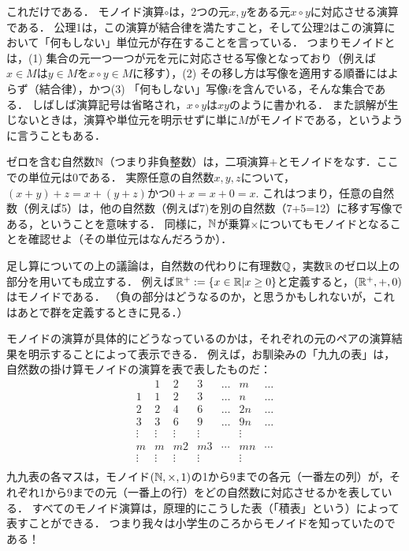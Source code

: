 \documentclass[11pt,a4paper,uplatex]{jsarticle}
\begin{document}
これだけである．
モノイド演算$\circ$は，2つの元$x,y$をある元$x \circ y$に対応させる演算である．
公理1は，この演算が結合律を満たすこと，そして公理2はこの演算において「何もしない」単位元が存在することを言っている．
つまりモノイドとは，(1) 集合の元一つ一つが元を元に対応させる写像となっており（例えば$x\in M$は$y \in M$を$x\circ y \in M$に移す），(2) その移し方は写像を適用する順番にはよらず（結合律），かつ(3) 「何もしない」写像$i$を含んでいる，そんな集合である．
しばしば演算記号は省略され，$x \circ y$は$xy$のように書かれる．
また誤解が生じないときは，演算や単位元を明示せずに単に$M$がモノイドである，というように言うこともある．


\begin{example}
ゼロを含む自然数$\mathbb{N}$（つまり非負整数）は，二項演算$+$とモノイドをなす．ここでの単位元は$0$である．
実際任意の自然数$x, y, z$について，$(x+y)+z = x + (y+z)$かつ$0 + x = x + 0 = x$. 
これはつまり，任意の自然数（例えば5）は，他の自然数（例えば7)を別の自然数（7+5=12）に移す写像である，ということを意味する．
同様に，$\mathbb{N}$が乗算$\times$についてもモノイドとなることを確認せよ（その単位元はなんだろうか）．
\end{example}

\begin{example}
足し算についての上の議論は，自然数の代わりに有理数$\mathbb{Q}$，実数$\mathbb{R}$のゼロ以上の部分を用いても成立する．
例えば$\mathbb{R}^+ := \{ x \in \mathbb{R} | x \geq 0 \}$と定義すると，$(\mathbb{R}^+, +, 0)$はモノイドである．
（負の部分はどうなるのか，と思うかもしれないが，これはあとで群を定義するときに見る．）
\end{example}

モノイドの演算が具体的にどうなっているのかは，それぞれの元のペアの演算結果を明示することによって表示できる．
例えば，お馴染みの「九九の表」は，自然数の掛け算モノイドの演算を表で表したものだ：
\[
\begin{array}{c|cccccc}
       & 1 & 2 & 3 & \dots & m & \dots \\ \hline
     1 & 1 & 2 & 3 & \dots & n & \dots \\ 
     2 & 2 & 4 & 6 & \dots & 2n & \dots \\ 
     3 & 3 & 6 & 9 & \dots & 9n & \dots \\ 
     \vdots & \vdots & \vdots & \vdots & & \vdots & \\
     m & m & m2 & m3 & \cdots & mn & \cdots \\
     \vdots & \vdots & \vdots & \vdots & & \vdots & \\
\end{array}
\]
九九表の各マスは，モノイド$(\mathbb{N}, \times, 1)$の1から9までの各元（一番左の列）が，それぞれ1から9までの元（一番上の行）をどの自然数に対応させるかを表している．
すべてのモノイド演算は，原理的にこうした表（「積表」という）によって表すことができる．
つまり我々は小学生のころからモノイドを知っていたのである！
\end{document}
